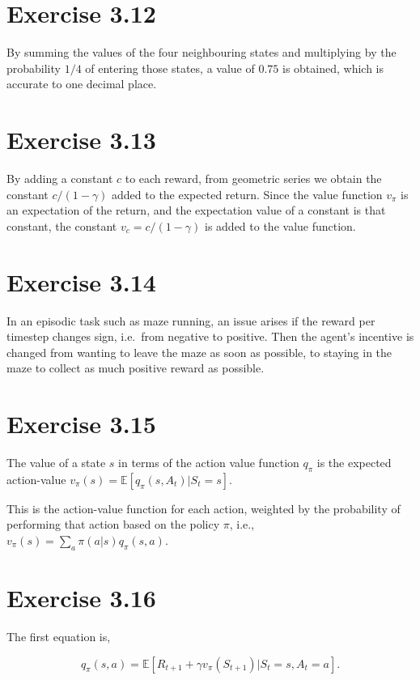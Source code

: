 \documentclass[a4paper, 12pt, titlepage]{article}
\begin{document}
\section{Exercise 3.12}

By summing the values of the four neighbouring states and multiplying by the
probability $1/4$ of entering those states, a value of $0.75$ is obtained,
which is accurate to one decimal place.


\section{Exercise 3.13}

By adding a constant $c$ to each reward, from geometric series we obtain the
constant $c/(1 - \gamma)$ added to the expected return. Since the value
function $v_{\pi}$ is an expectation of the return, and the expectation value
of a constant is that constant, the constant $v_c = c/(1 - \gamma)$ is added to
the value function.


\section{Exercise 3.14}

In an episodic task such as maze running, an issue arises if the reward per
timestep changes sign, i.e.\ from negative to positive. Then the agent's
incentive is changed from wanting to leave the maze as soon as possible, to
staying in the maze to collect as much positive reward as possible.


\section{Exercise 3.15}

The value of a state $s$ in terms of the action value function $q_{\pi}$ is the
expected action-value
$v_{\pi}(s) = \mathbb{E}\left[q_{\pi}(s, A_t) | S_t = s\right]$.

This is the action-value function for each action, weighted by the probability
of performing that action based on the policy $\pi$, i.e.,
$v_{\pi}(s) = \sum_a \pi(a | s) q_{\pi}(s, a)$.


\section{Exercise 3.16}

The first equation is,

\begin{equation*}
        q_{\pi}(s, a) =
                \mathbb{E}\left[R_{t + 1} + \gamma v_{\pi}(S_{t + 1}) | S_t = s, A_t = a\right].
\end{equation*}
\end{document}
